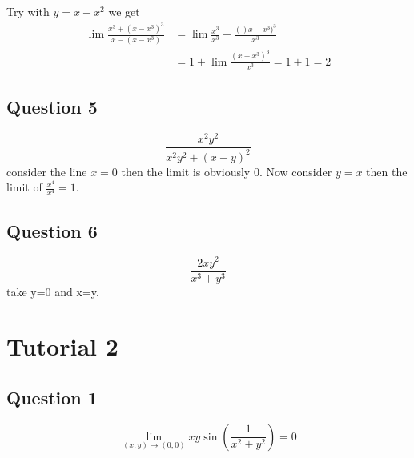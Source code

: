 \documentclass[oneside,11pt,pdftex]{book}%
\numberwithin{section}{chapter}
\numberwithin{equation}{chapter}
\begin{document}
Try with $ y=x-x^2 $ we get
\begin{align*}
	\lim \frac{x^3+(x-x^3)^3}{x-(x-x^3)}&=\lim \frac{x^3}{x^3}+\frac{()x-x^3)^3}{x^3}\\
	&= 1+ \lim \frac{(x-x^3)^3}{x^3} = 1+ 1=2
\end{align*}



\section{Question 5}
\[ \frac{x^2y^2}{x^2y^2+(x-y)^2} \] consider the line $ x=0 $ then the limit is obviously 0. Now consider $ y=x $ then the limit of $ \frac{x^4}{x^4} =1$.


\section{Question 6}
\[ \frac{2xy^2}{x^3+y^3} \] take y=0 and x=y.
\backmatter

\chapter{Tutorial 2}
\section{Question 1}
\[ \lim_{(x,y)\rightarrow (0,0)} xy \sin \left(\frac{1}{x^2+y^2} \right)=0\]
\thispagestyle{empty}%
{\ }
\newpage
\end{document}
